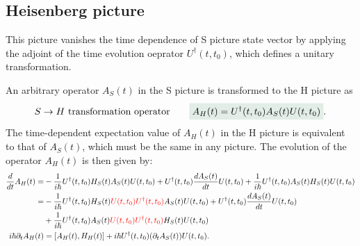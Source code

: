 \subsection{Heisenberg picture}
This picture vanishes the time dependence of S picture state vector by applying the adjoint of the time evolution oeprator $U^\dagger(t,t_0)$, which defines a unitary transformation.

An arbitrary operator $A_S(t)$ in the S picture is transformed to the H picture as 
\begin{align*}
    \text{$S\to H$ transformation operator}\qquad\highlight{A_H(t)=U^\dagger(t,t_0)A_S(t)U(t,t_0)}.
\end{align*}
The time-dependent expectation value of $A_H(t)$ in the H picture is equivalent to that of $A_S(t)$, which must be the same in any picture.
The evolution of the operator $A_H(t)$ is then given by:
\begin{align*}
    \frac{d}{dt}A_H(t)=&-\frac{1}{i\hbar}U^\dagger(t,t_0)H_S(t)A_S(t)U(t,t_0)+U^\dagger(t,t_0)\frac{dA_S(t)}{dt}U(t,t_0)+\frac{1}{i\hbar}U^\dagger(t,t_0)A_S(t)H_S(t)U(t,t_0)\\
    =&-\frac{1}{i\hbar}U^\dagger(t,t_0)H_S(t)\textcolor{red}{U(t,t_0)U^\dagger(t,t_0)}A_S(t)U(t,t_0)+U^\dagger(t,t_0)\frac{dA_S(t)}{dt}U(t,t_0)\\
    &+\frac{1}{i\hbar}U^\dagger(t,t_0)A_S(t)\textcolor{red}{U(t,t_0)U^\dagger(t,t_0)}H_S(t)U(t,t_0)\\
    i\hbar\partial_tA_H(t)&=[A_H(t),H_H(t)]+i\hbar U^\dagger(t,t_0)(\partial_tA_S(t))U(t,t_0).
\end{align*}

